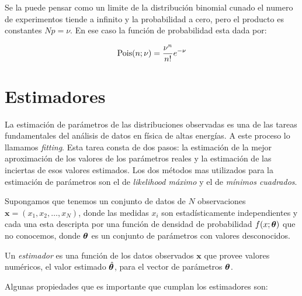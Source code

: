 Se la puede pensar como un limite de la distribución binomial cunado el numero de experimentos
tiende a infinito y la probabilidad a cero, pero el producto es constantes $Np = \nu$. En ese
caso la función de probabilidad esta dada por:

\begin{equation}
  \Pois(n;\nu) = \frac{\nu^n}{n!} e^{-\nu} %
\end{equation}




\section{Estimadores}

La estimación de parámetros de las distribuciones observadas es una de las tareas fundamentales
del análisis de datos en física de altas energías. A este proceso lo llamamos \emph{fitting}.
Esta tarea consta de dos pasos: la estimación de la mejor aproximación de los valores de los
parámetros reales y la estimación de las inciertas de esos valores estimados. Los
dos métodos mas utilizados para la estimación de parámetros son el de \emph{likelihood máximo} y el de
\emph{mínimos cuadrados}.

Supongamos que tenemos un conjunto de datos de $N$ observaciones $\bm{x} = (x_1, x_2, \ldots, x_N)$,
donde las medidas $x_i$ son estadísticamente independientes y cada una esta descripta por una
función de densidad de probabilidad  $f(x;\bm{\theta})$ que no conocemos, donde $\bm{\theta}$ es un
conjunto de parámetros con valores desconocidos.

Un \emph{estimador} es una función de los datos observados $\bm{x}$ que provee valores numéricos,
el valor estimado $\hat{\bm{\theta}}$, para el vector de parámetros $\bm{\theta}$.

Algunas propiedades que es importante que cumplan los estimadores son:

